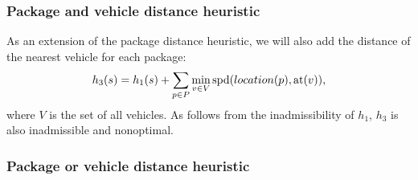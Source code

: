 \subsubsection{Package and vehicle distance heuristic}\label{sfa3}

As an extension of the package distance heuristic,
we will also add the distance of the nearest vehicle for
each package:
$$h_3(s) = h_1(s) + \sum_{p \in P} \min_{v \in V} \textrm{spd}(location(p), \textrm{at}(v)),$$
where $V$ is the set of all vehicles.
As follows from the inadmissibility of $h_1$, $h_3$
is also inadmissible and nonoptimal.

\subsubsection{Package or vehicle distance heuristic}\label{sfa4}

